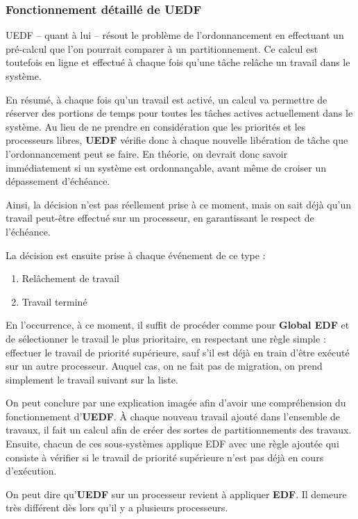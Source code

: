 		\subsubsection{Fonctionnement détaillé de UEDF}
		UEDF -- quant à lui -- résout le problème de l'ordonnancement en effectuant un pré-calcul 
		que l'on pourrait comparer à un partitionnement. Ce calcul est toutefois en ligne et 
		effectué à chaque fois qu'une tâche relâche un travail dans le système.
		
		En résumé, à chaque fois qu'un travail est activé, un calcul va permettre 
		de réserver des portions de temps pour toutes les tâches actives 
		actuellement dans le système. Au lieu de ne prendre en considération que 
		les priorités et les processeurs libres, \textbf{UEDF }vérifie donc à 
		chaque nouvelle libération de tâche que l'ordonnancement peut se faire. 
		En théorie, on devrait donc savoir immédiatement si un système est ordonnançable, 
		avant même de croiser un dépassement d'échéance. 
		
		Ainsi, la décision n'est pas réellement prise à ce moment, 
		mais on sait déjà qu'un travail peut-être effectué sur un 
		processeur, en garantissant le respect de l'échéance.
		
		La décision est ensuite prise à chaque événement de ce type :
		\begin{enumerate}
			\item Relâchement de travail
			\item Travail terminé
		\end{enumerate}

		En l'occurrence, à ce moment, il suffit de procéder comme pour \textbf{Global EDF} et de sélectionner le travail le plus prioritaire, en respectant 
		une règle simple : effectuer le travail de priorité supérieure, sauf s'il 
		est déjà en train d'être exécuté sur un autre processeur. Auquel cas, on ne 
		fait pas de migration, on prend simplement le travail suivant sur la liste.\newline
		
		On peut conclure par une explication imagée afin d'avoir une compréhension du fonctionnement d'\textbf{UEDF}. À chaque nouveau travail ajouté dans l'ensemble de travaux, 
		il fait un calcul afin de créer des sortes de partitionnements des travaux. 
		Ensuite, chacun de ces sous-systèmes applique EDF avec une règle ajoutée qui consiste 
		à vérifier si le travail de priorité supérieure n'est pas déjà en cours d'exécution.
		
		On peut dire qu'\textbf{UEDF} sur un processeur revient à appliquer \textbf{EDF}. Il 
		demeure très différent dès lors qu'il y a plusieurs processeurs.
		

